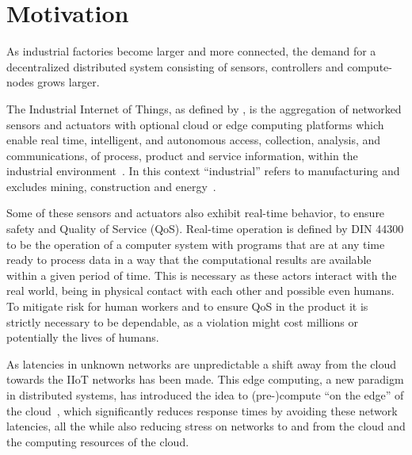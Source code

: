 \section{Motivation}

As industrial factories become larger and more connected, the demand for a
decentralized distributed system consisting of sensors, controllers and
compute-nodes grows larger.

The Industrial Internet of Things, as defined by
\citeauthor{boyes_industrial_2018}, is the aggregation of networked sensors and
actuators with optional cloud or edge computing platforms which enable real
time, intelligent, and autonomous access, collection, analysis, and
communications, of process, product and service information, within the
industrial environment~\cite{boyes_industrial_2018}. In this context
\enquote{industrial} refers to manufacturing and excludes mining, construction
and energy~\cite{noauthor_industry_nodate}.

Some of these sensors and actuators also exhibit real-time behavior, to ensure
safety and Quality of Service (QoS). Real-time operation is defined by DIN 44300
to be the operation of a computer system with programs that are at any time
ready to process data in a way that the computational results are available
within a given period of time. This is necessary as these actors interact with
the real world, being in physical contact with each other and possible even
humans. To mitigate risk for human workers and to ensure QoS in the product it
is strictly necessary to be dependable, as a violation might cost millions or
potentially the lives of humans.

As latencies in unknown networks are unpredictable a shift away from the cloud
towards the IIoT networks has been made. This edge computing, a new paradigm in
distributed systems, has introduced the idea to (pre-)compute \enquote{on the
edge} of the cloud~\cite{shi_edge_2016}, which significantly reduces response
times by avoiding these network latencies, all the while also reducing stress on
networks to and from the cloud and the computing resources of the cloud.


